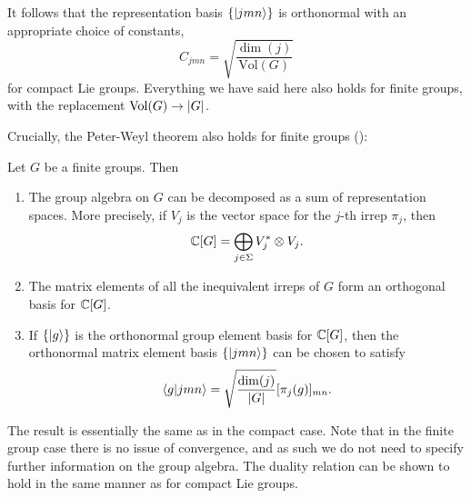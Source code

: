 It follows that the representation basis $\{\ket{jmn}\}$ is orthonormal with an appropriate choice of constants,
\begin{equation*}
    C_{jmn} = \sqrt{\frac{\dim(j)}{\mathrm{Vol}(G)} }
\end{equation*}
for compact Lie groups.
Everything we have said here also holds for finite groups, with the replacement $\mathrm{Vol}(G) \to \abs{G} $.

Crucially, the Peter-Weyl theorem also holds for finite groups (\citneeded):

\begin{theorem}
    Let $G$ be a finite groups.
    Then
    \begin{enumerate}[label=(\roman*)]
        \item The group algebra on $G$ can be decomposed as a sum of representation spaces.
            More precisely, if $V_j$ is the vector space for the $j$-th irrep $\pi_j$, then
            \begin{equation}
                \mathbb{C}[G] = \bigoplus_{j \in \Sigma} V_{j}^{\ast} \otimes V_{j}.
            \end{equation}

        \item The matrix elements of all the inequivalent irreps of $G$ form an orthogonal basis for $\mathbb{C}[G] $.

        \item If $\{\ket{g}\}$ is the orthonormal group element basis for $\mathbb{C}[G] $, then the orthonormal matrix element basis $\{\ket{jmn}\}$ can be chosen to satisfy
            \begin{equation}
                \braket{g}{jmn} =
                \sqrt{\frac{\dim(j)}{\abs{G}} } [\pi_j(g)]_{mn}.
            \end{equation}
    \end{enumerate}
\end{theorem}

The result is essentially the same as in the compact case.
Note that in the finite group case there is no issue of convergence, and as such we do not need to specify further information on the group algebra.
The duality relation can be shown to hold in the same manner as for compact Lie groups.
